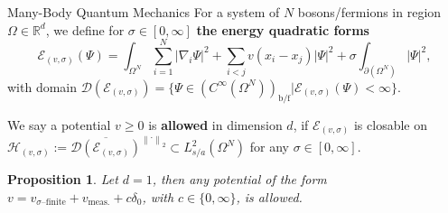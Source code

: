 \documentclass{beamer}[10]
\newcommand{\norm}[1]{\left\lVert #1 \right\rVert}
\newcommand{\abs}[1]{\left\lvert #1 \right\rvert}
\newcommand{\dom}[1]{\mathcal D\left(#1\right)}
\renewcommand{\braket}[1]{\left\langle#1\right\rangle}
\newcommand{\ie}{\emph{i.e.} }
\newcommand{\dd}{\partial }
\newcommand{\R}{\mathbb{R}}
\newtheorem{mproposition}{Proposition}
\newtheorem{mremark}{Remark}
\begin{document}
%


\begin{frame}{Many-Body Quantum Mechanics}
	\small
		For a system of $ N $ bosons/fermions in region $ \Omega\in\R^d $, we define for $ \sigma\in[0,\infty] $ \textbf{the energy quadratic forms}
		\begin{equation}\label{key}
			\mathcal{E}_{(v,\sigma)}(\Psi)=\int_{\Omega^N} \sum_{i=1}^{N}\abs{\nabla_i\Psi}^2+\sum_{i<j} v(x_i-x_j)\abs{\Psi}^2+\sigma\int_{\dd (\Omega^N)}\abs{\Psi}^2,
		\end{equation}
		with domain $ \dom{\mathcal{E}_{(v,\sigma)}}=\{\Psi\in (C^\infty(\Omega^N))_{\text{b/f}}\vert \mathcal{E}_{(v,\sigma)}(\Psi)<\infty\} $. 
\begin{definition}
	We say a potential $ v\geq 0 $ is \textbf{allowed} in dimension $ d $, if $ \mathcal{E}_{(v,\sigma)} $ is closable on $ \mathcal{H}_{(v,\sigma)}:=\overline{\dom{\mathcal{E}_{(v,\sigma)}}}^{\norm{\cdot}_2}\subset L^2_{s/a}(\Omega^N)$ for any $ \sigma\in[0,\infty] $.
\end{definition}
\begin{mproposition}\label{Lemma1dPotentialAllowed}
	Let $ d=1 $, then any potential of the form $v=v_{\sigma\text{--finite}}+v_{\text{meas.}}+c\delta_0 $, with $ c\in\{0,\infty\} $, is allowed.
\end{mproposition}
\end{frame}
\end{document}
